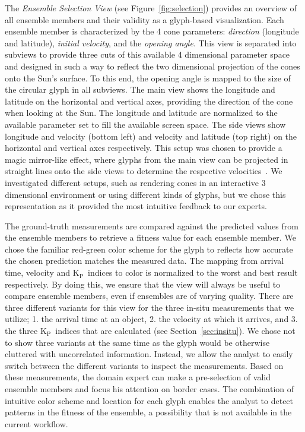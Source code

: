 \documentclass[journal]{vgtc}                %
\newcommand{\kpIndex}{$\textrm{K}_\textrm{P}$}
\begin{document}
The \emph{Ensemble Selection View} (see Figure~\ref{fig:selection}) provides an overview of all ensemble members and their validity as a glyph-based visualization. Each ensemble member is characterized by the 4 cone parameters: \emph{direction} (longitude and latitude), \emph{initial velocity}, and the \emph{opening angle}. This view is separated into subviews to provide three cuts of this available 4 dimensional parameter space and designed in such a way to reflect the two dimensional projection of the cones onto the Sun's surface. To this end, the opening angle is mapped to the size of the circular glyph in all subviews. The main view shows the longitude and latitude on the horizontal and vertical axes, providing the direction of the cone when looking at the Sun. The longitude and latitude are normalized to the available parameter set to fill the available screen space. The side views show longitude and velocity (bottom left) and velocity and latitude (top right) on the horizontal and vertical axes respectively. This setup was chosen to provide a magic mirror-like effect, where glyphs from the main view can be projected in straight lines onto the side views to determine the respective velocities~\cite{konig1999multiple}. We investigated different setups, such as rendering cones in an interactive 3 dimensional environment or using different kinds of glyphs, but we chose this representation as it provided the most intuitive feedback to our experts.

The ground-truth measurements are compared against the predicted values from the ensemble members to retrieve a fitness value for each ensemble member. We chose the familiar red-green color scheme for the glyph to reflects how accurate the chosen prediction matches the measured data. The mapping from arrival time, velocity and \kpIndex\ indices to color is normalized to the worst and best result respectively. By doing this, we ensure that the view will always be useful to compare ensemble members, even if ensembles are of varying quality. There are three different variants for this view for the three in-situ measurements that we utilize; 1. the arrival time at an object, 2. the velocity at which it arrives, and 3. the three \kpIndex\ indices that are calculated (see Section~\ref{sec:insitu}). We chose not to show three variants at the same time as the glyph would be otherwise cluttered with uncorrelated information. Instead, we allow the analyst to easily switch between the different variants to inspect the measurements. Based on these measurements, the domain expert can make a pre-selection of valid ensemble members and focus his attention on border cases. The combination of intuitive color scheme and location for each glyph enables the analyst to detect patterns in the fitness of the ensemble, a possibility that is not available in the current workflow.
\end{document}
